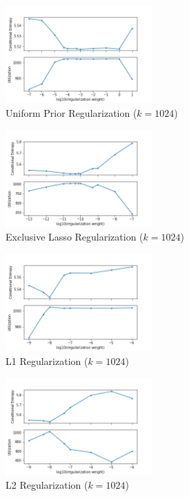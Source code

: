 \documentclass[11pt,letterpaper]{article}
\begin{document}
\begin{figure}
  \caption{Uniform Prior Regularization ($k=1024$)}
\label{f:fb}
  \centering
    \includegraphics[width=0.5\textwidth]{skipgram_flat_b.png}
\end{figure}
\begin{figure}
  \caption{Exclusive Lasso Regularization ($k=1024$)}
\label{f:fel}
  \centering
    \includegraphics[width=0.5\textwidth]{skipgram_flat_el.png}
\end{figure}
\begin{figure}
  \caption{L1 Regularization ($k=1024$)}
\label{f:fl1}
  \centering
    \includegraphics[width=0.5\textwidth]{skipgram_flat_l1.png}
\end{figure}
\begin{figure}
  \caption{L2 Regularization ($k=1024$)}
\label{f:fl2}
  \centering
    \includegraphics[width=0.5\textwidth]{skipgram_flat_l2.png}
\end{figure}
\end{document}
